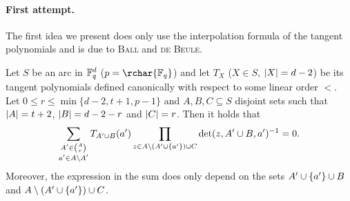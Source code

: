 \documentclass[a4paper]{article}
\begin{document}
\paragraph{First attempt.} The first idea we present does only use the interpolation formula of
the tangent polynomials and is due to \textsc{Ball} and
\textsc{de Beule}.

\begin{lemma}
  Let $S$ be an arc in $\mathbb{F}_{q}^d$ ($p=\rchar{\field{q}}$) and let $T_X$
  ($X\in S$, $\left|X\right|=d-2$) be its tangent polynomials defined canonically with respect to some linear order $<$. Let $0\leq r\leq\min\{d-2,t+1,p-1\}$ and $A,B,C\subseteq S$ disjoint sets such that $\left|A\right|=t+2$, $\left|B\right|=d-2-r$ and $\left|C\right|=r$. Then it holds that
  \begin{equation}
    \sum_{\substack{A'\in\binom{A}{r}\\ a'\in A\setminus A'}}{T_{A'\setjoin B}(a')\prod_{z\in A\setminus (A'\setjoin\{a'\})\setjoin C}\det(z,A'\setjoin B,a')^{-1}}=0\text{.}
  \end{equation}
  Moreover, the expression in the sum does only depend on the sets $A'\cup\{a'\}\cup B$ and $A\setminus (A'\cup\{a'\})\cup C$.
\end{lemma}
\end{document}
